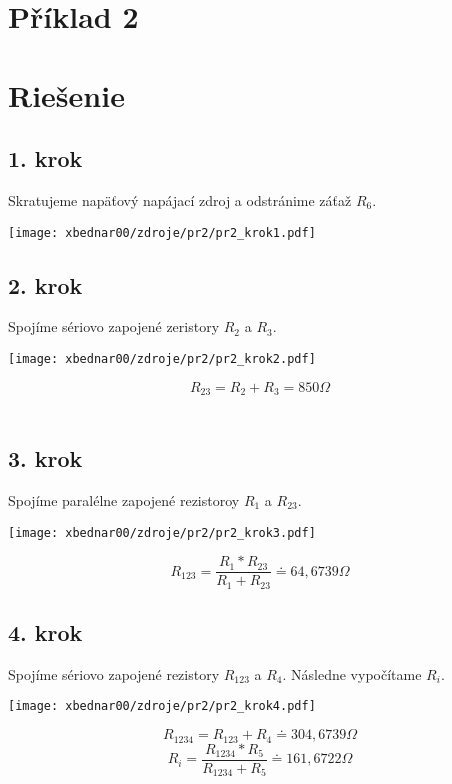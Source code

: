 \section{Příklad 2}

\section*{Riešenie}
\subsection*{1. krok}
Skratujeme napäťový napájací zdroj a odstránime záťaž $R_6$.\\
\begin{center}
\texttt{[image: xbednar00/zdroje/pr2/pr2\_krok1.pdf]}
\end{center}

\newpage
\subsection*{2. krok}
Spojíme sériovo zapojené zeristory $R_2$ a $R_3$.
\begin{center}
\texttt{[image: xbednar00/zdroje/pr2/pr2\_krok2.pdf]}
\end{center}
$$R_{23}=R_2+R_3=850\Omega$$\\

\subsection*{3. krok}
Spojíme paralélne zapojené rezistoroy $R_1$ a $R_{23}$.
\begin{center}
\texttt{[image: xbednar00/zdroje/pr2/pr2\_krok3.pdf]}
\end{center}
$$R_{123}=\frac{R_1*R_{23}}{R_1+R_{23}}\doteq64,6739\Omega$$

\newpage
\subsection*{4. krok}
Spojíme sériovo zapojené  rezistory $R_{123}$ a $R_4$. Následne vypočítame $R_i$.
\begin{center}
\texttt{[image: xbednar00/zdroje/pr2/pr2\_krok4.pdf]}
\end{center}
$$R_{1234}=R_{123}+R_4\doteq304,6739\Omega$$
$$R_i=\frac{R_{1234}*R_5}{R_{1234}+R_5}\doteq161,6722\Omega$$

